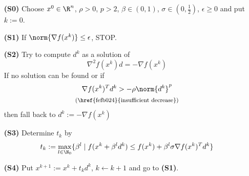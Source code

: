 \begin{enumerate}
  \item [\textbf{(S0)}] Choose $x^0\in\R^n$, $\rho>0$, $p>2$, $\beta\in(0,1)$, $\sigma\in(0,\frac12)$, $\epsilon\geq0$ and put $k:=0$.
  \item [\textbf{(S1)}] If $\norm{\nabla f(x^k)}\leq\epsilon$, STOP.
  \item [\textbf{(S2)}] Try to compute $d^k$ as a solution of
        $$\nabla^2f(x^k)d=-\nabla f(x^k)$$
        If no solution can be found or if
        \begin{gather*}
          \nabla f(x^k)^Td^k>-\rho\norm{d^k}^p\\
          \text{\footnotesize{(\href{fefb024}{insufficient decrease})}}
        \end{gather*}
        then fall back to $d^k:=-\nabla f(x^k)$
  \item [\textbf{(S3)}] Determine $t_k$ by
        $$t_k:=\max_{l\in\N_0}\{\beta^l\mid f(x^k+\beta^ld^k)\leq f(x^k)+\beta^l\sigma\nabla f(x^k)^Td^k\}$$
  \item [\textbf{(S4)}] Put $x^{k+1}:=x^k+t_kd^k$, $k\gets k+1$ and go to \textbf{(S1)}.
\end{enumerate}